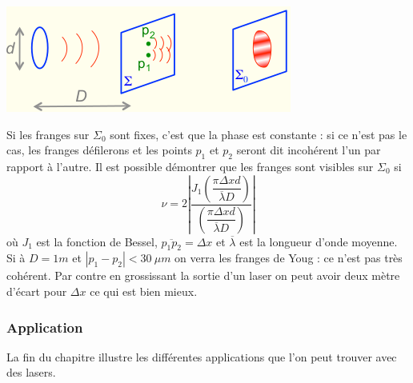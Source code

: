 	\begin{center}
	\includegraphics[scale=0.75]{ch1/image7.png}
	\end{center}
\newpage	
	Si les franges sur $\Sigma_0$ sont fixes, c'est que la phase est constante : si ce n'est pas le cas, les 
	franges défilerons et les points $p_1$ et $p_2$ seront dit incohérent l'un par rapport à l'autre. Il est 
	possible démontrer que les franges sont visibles sur $\Sigma_0$ si
	\begin{equation}
	\nu = 2	\left|\dfrac{J_1\left(\dfrac{\pi\Delta x d}{\overline{\lambda}D}\right)}{\left(\dfrac{\pi\Delta x d}{\overline{\lambda}D}\right)}\right|
	\end{equation}
	où $J_1$ est la fonction de Bessel, $\overline{p_1p_2}= \Delta x$ et $\overline{\lambda}$ est la longueur d'onde moyenne.\\
	
	Si à $D=1m$ et $|p_1-p_2|< 30\ \mu m$ on verra les franges de Youg : ce n'est pas très cohérent. Par contre 
	en grossissant la sortie d'un laser on peut avoir deux mètre d'écart pour $\Delta x$ ce qui est bien mieux.
	
	
	\subsubsection{Application}
	La fin du chapitre illustre les différentes applications que l'on peut trouver avec des lasers.
	
	
	
	
	
	
	
	
	
	
	
	
	
	
	
	
	
	
	
	
	
	
	
	